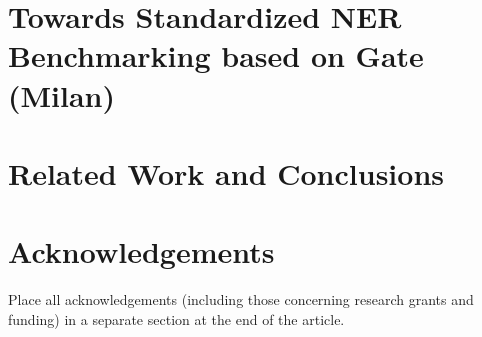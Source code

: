 \documentclass[10pt, a4paper]{article}
\begin{document}
\section{Towards Standardized NER Benchmarking based on Gate (Milan)}


\section{Related Work and Conclusions}





% 
% 
% 
% 

\section{Acknowledgements}

Place all acknowledgements (including those concerning research grants and funding) in a separate section at the end of the article.



\end{document}
